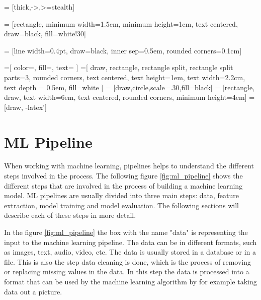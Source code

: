 \usetikzlibrary{shapes,arrows,chains}
\usetikzlibrary[calc]
\usetikzlibrary{shapes.geometric, arrows, fit, calc, automata, positioning, shapes.multipart}
\usepackage{comment}
\renewenvironment{comment}{}{}
     = [thick,->,>=stealth]

     = [rectangle, minimum width=1.5cm, minimum height=1cm, text centered, draw=black, fill=white!30]

     = [line width=0.4pt, draw=black, inner sep=0.5em, rounded corners=0.1cm]

    \usetikzlibrary{shapes.geometric, arrows, fit, calc, automata, positioning}
=[
    color=\umldrawcolor,
    fill=\umlfillcolor,
    text=\umltextcolor
]
=[
    draw,
    rectangle,
    rectangle split,
    rectangle split parts=3,
    rounded corners,
    text centered,
    text height=1em,
    text width=2.2cm,
    text depth = 0.5em,
    fill=white
]
 = [draw,circle,scale=.30,fill=black]
 = [rectangle, draw, text width=6em, text centered, rounded corners, minimum height=4em]
 = [draw, -latex']

\section{ML Pipeline}
When working with machine learning, pipelines helps to understand the different steps involved in the process. The following figure \ref{fig:ml_pipeline} shows the different steps that are involved in the process of building a machine learning model.
ML pipelines are usually divided into three main steps: data, feature extraction, model training and model evaluation. The following sections will describe each of these steps in more detail. 

In the figure \ref{fig:ml_pipeline} the box with the name "data" is representing the input to the machine learning pipeline. The data can be in different formats, such as images, text, audio, video, etc. The data is usually stored in a database or in a file. This is also the step data cleaning is done, which is the process of removing or replacing missing values in the data. In this step the data is processed into a format that can be used by the machine learning algorithm by for example taking data out a picture. 

